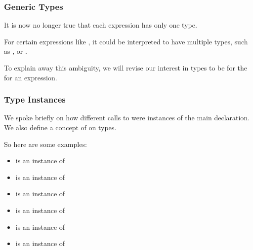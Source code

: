 \documentclass[aspectratio=169]{beamer}
\begin{document}
\begin{frame}[fragile]
  \frametitle{Generic Types}

  It is now no longer true that each expression has only one type.

  \pause
  \vspace{\fill}

  For certain expressions like , it could be
  interpreted to have multiple types, such as , or .

  \pause
  \vspace{\fill}

  To explain away this ambiguity, we will revise our interest in types to be
  for the  for an expression.

  \pause
  \vspace{\fill}

\end{frame}

\begin{frame}[fragile]
  \frametitle{Type Instances}

  We spoke briefly on how different calls to  were instances of
  the main declaration. We also define a concept of  on types.

  \pause
  \vspace{\fill}


  \pause
  \vspace{\fill}

  So here are some examples:
  \begin{itemize}
    \item {} is an instance of 
    \item {} is an instance of 
    \item {} is an instance of 
    \item {} is an instance of 
    \item {} is an instance of 
    \item {} is an instance of 
  \end{itemize}
\end{frame}
\end{document}
